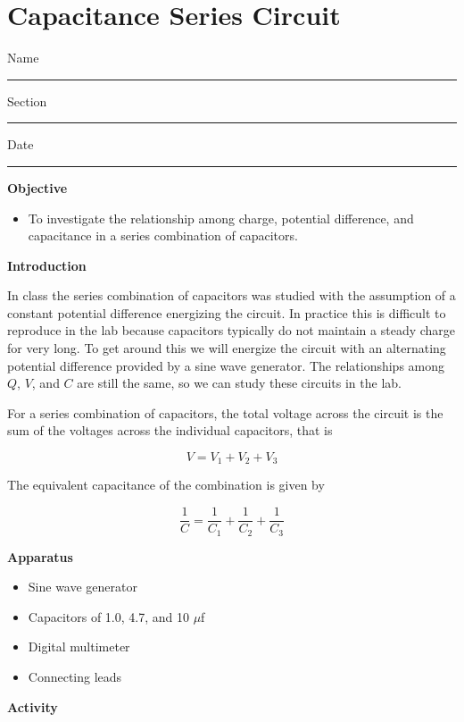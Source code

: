 
\section{Capacitance Series Circuit}

Name \rule{2.0in}{0.1pt}\hfill{}Section \rule{1.0in}{0.1pt}\hfill{}Date
\rule{1.0in}{0.1pt}

\textbf{Objective}

\begin{itemize}
\item To investigate the relationship among charge, potential difference, and capacitance in a series combination of capacitors.
\end{itemize}
\textbf{Introduction} 

In class the series combination of capacitors was studied with the assumption
of a constant potential difference energizing the circuit.  In practice this
is difficult to reproduce in the lab because capacitors typically do not
maintain a steady charge for very long.  To get around this we will energize
the circuit with an alternating potential difference provided by a sine wave
generator.  The relationships among $Q$, $V$, and $C$ are still the same, so
we can study these circuits in the lab.

For a series combination of capacitors, the total voltage across the circuit
is the sum of the voltages across the individual capacitors, that is

\begin{displaymath} V = V_1 + V_2 + V_3 \end{displaymath}

The equivalent capacitance of the combination is given by

\begin{displaymath} \frac{1}{C} = \frac{1}{C_1} + \frac{1}{C_2} + \frac{1}{C_3} \end{displaymath}

\textbf{Apparatus}

\begin{itemize}
\item Sine wave generator 
\item Capacitors of 1.0, 4.7, and 10 $\mu$f
\item Digital multimeter
\item Connecting leads
\end{itemize}
\textbf{Activity}


